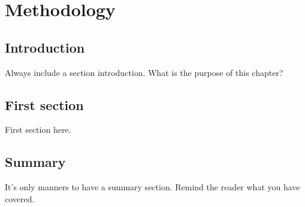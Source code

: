 
\chapter{Methodology}\label{chapter:methodology}

\section{Introduction}\label{sec:methodology-intro}
Always include a section introduction. What is the purpose of this chapter? 

\section{First section}\label{sec:methodology-first-section}
First section here.

\section{Summary}\label{sec:methodology-summary}
It's only manners to have a summary section. Remind the reader what you have covered. 
